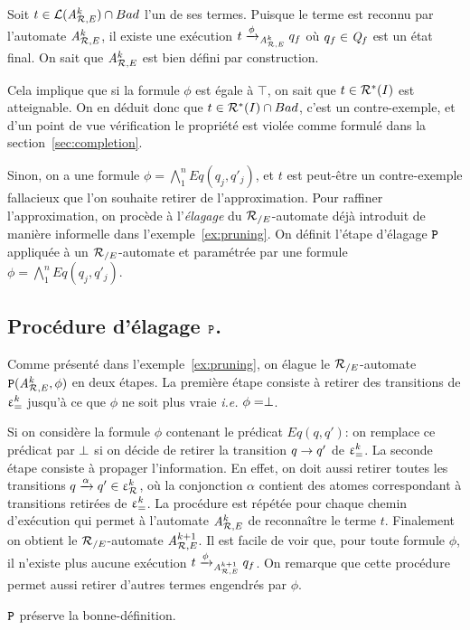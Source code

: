 Soit $t \in \mathcal{L}({\mathit A}_{\mathcal R,E}^k) \cap Bad$ l'un de ses termes. 
Puisque le terme est reconnu par l'automate ${\mathit A}_{\mathcal R,E}^k$, il existe
une exécution $t \xrightarrow{\phi}_{{\mathit A}_{\mathcal R,E}^k} q_f$ où $q_f \in \mathit Q_f$ est un état final.
On sait que ${\mathit A}_{\mathcal R,E}^k$ est bien défini par construction.

Cela implique que si la formule $\phi$ est égale à $\top$, on sait que $t \in \mathcal R^*(I)$ est atteignable.
On en déduit donc que $t \in \mathcal R^*(I) \cap Bad$, c'est un contre-exemple, et d'un point de vue
vérification le propriété est violée comme formulé dans la section~\ref{sec:completion}.

Sinon, on a une formule $\phi = \bigwedge_1^n Eq(q_j, q'_j)$, et $t$ est peut-être un contre-exemple 
fallacieux que l'on souhaite retirer de l'approximation.
Pour raffiner l'approximation, on procède à l'\emph{élagage} du ${\mathcal R_{/E}}$-automate
déjà introduit de manière informelle dans l'exemple~\ref{ex:pruning}. On définit
l'étape d'élagage $\mathtt{P}$ appliquée à un ${\mathcal R_{/E}}$-automate et paramétrée par 
une formule $\phi = \bigwedge_1^n Eq(q_j, q'_j)$.



\subsection{Procédure d'élagage $\mathtt{P}$.}
\label{subsec:refinementstep}
Comme présenté dans l'exemple~\ref{ex:pruning}, on élague le
${\mathcal R_{/E}}$-automate $\mathtt{P}({\mathit A}_{\mathcal R,E}^k, \phi)$ en deux étapes. La première étape
consiste à retirer des transitions de $\upvarepsilon_{=}^k$ jusqu'à ce que $\phi$
ne soit plus vraie {\em i.e.} $\phi = \perp$.

Si on considère la formule $\phi$ contenant le prédicat $Eq(q,q')$: on
remplace ce prédicat par $\perp$ si on décide de retirer la
transition $q \rightarrow q'$ de $\upvarepsilon_{=}^k$. La seconde étape consiste à
propager l'information.  En effet, on doit aussi retirer toutes les
transitions $q \xrightarrow{\alpha} q' \in \upvarepsilon_{\mathcal R}^k$, où la conjonction $\alpha$
contient des atomes correspondant à transitions retirées de $\upvarepsilon_{=}^k$.
La procédure est répétée pour chaque chemin d'exécution qui permet à
l'automate ${\mathit A}_{\mathcal R,E}^k$ de reconnaître le terme $t$. Finalement on
obtient le ${\mathcal R_{/E}}$-automate ${\mathit A}_{\mathcal R,E}^{k+1}$.  Il est facile de voir que,
pour toute formule $\phi$, il n'existe plus aucune exécution $t
\xrightarrow{\phi}_{{\mathit A}_{\mathcal R,E}^{k+1}} q_f$.  On remarque que cette procédure
permet aussi retirer d'autres termes engendrés par $\phi$.

\begin{property}
   $\mathtt{P}$ préserve la bonne-définition.
\end{property}

